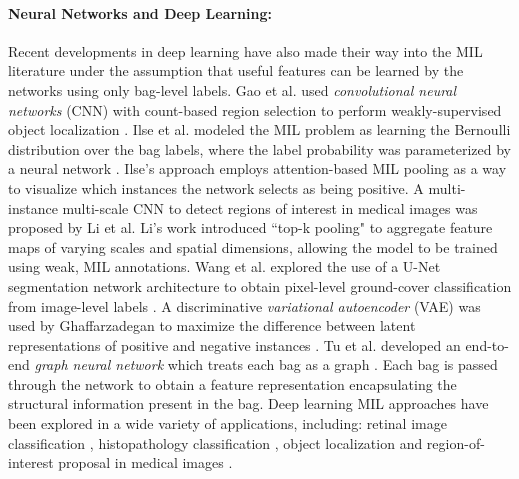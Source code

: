 \paragraph{Neural Networks and Deep Learning:} \label{sec:mil_deep_learning}

Recent developments in deep learning have also made their way into the MIL literature under the assumption that useful features can be learned by the networks using only bag-level labels.  Gao et al. used \textit{convolutional neural networks} (CNN) with count-based region selection to perform weakly-supervised object localization \citep{Gao2017CountGuidedWeaklySupervisedLocalization}.  Ilse et al. modeled the MIL problem as learning the Bernoulli distribution over the bag labels, where the label probability was parameterized by a neural network \citep{Ilse2018AttentionBasedDeepMIL}.  Ilse's approach employs attention-based MIL pooling as a way to visualize which instances the network selects as being positive.  A multi-instance multi-scale CNN to detect regions of interest in medical images \citep{Li2019CNNMedicalImageClassification} was proposed by Li et al.  Li's work introduced ``top-k pooling" to aggregate feature maps of varying scales and spatial dimensions, allowing the model to be trained using weak, MIL annotations.  Wang et al. explored the use of a U-Net segmentation network architecture to obtain pixel-level ground-cover classification from image-level labels \citep{Wang2020WSDeepLearningRemoteSensing}.  A discriminative \textit{variational autoencoder} (VAE) was used by Ghaffarzadegan to maximize the difference between latent representations of positive and negative instances \citep{Ghaffarzadegan2018MILVAE}.  Tu et al. developed an end-to-end \textit{graph neural network} which treats each bag as a graph \citep{Tu2019MILGraphNN}.  Each bag is passed through the network to obtain a feature representation encapsulating the structural information present in the bag.  Deep learning MIL approaches have been explored in a wide variety of applications, including: retinal image classification \citep{Tu2019MILGraphNN}, histopathology classification \citep{Ilse2018AttentionBasedDeepMIL}, object localization \citep{Gao2017CountGuidedWeaklySupervisedLocalization} and region-of-interest proposal in medical images \citep{Li2019CNNMedicalImageClassification}.


